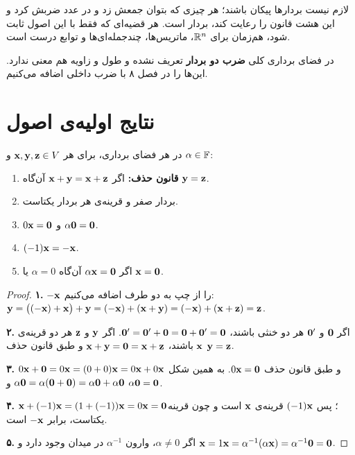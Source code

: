 \begin{intuition}
لازم نیست بردارها پیکان باشند؛ هر چیزی که بتوان جمعش زد و در عدد ضربش کرد و این هشت قانون را رعایت کند، بردار است. هر قضیه‌ای که فقط با این اصول ثابت شود، هم‌زمان برای $\mathbb{R}^n$، ماتریس‌ها، چندجمله‌ای‌ها و توابع درست است.
\end{intuition}

\begin{warning}
در فضای برداری کلی \textbf{ضرب دو بردار} تعریف نشده و طول و زاویه هم معنی ندارد. این‌ها را در فصل ۸ با ضرب داخلی  اضافه می‌کنیم.
\end{warning}

\section{نتایج اولیه‌ی اصول}

\begin{theorem}\label{thm:vs-basic}
در هر فضای برداری، برای هر $\mathbf{x},\mathbf{y},\mathbf{z}\in V$ و $\alpha\in\mathbb{F}$:
\begin{enumerate}
  \item \textbf{قانون حذف:} اگر $\mathbf{x}+\mathbf{y}=\mathbf{x}+\mathbf{z}$ آن‌گاه $\mathbf{y}=\mathbf{z}$.
  \item بردار صفر و قرینه‌ی هر بردار یکتاست.
  \item $0\mathbf{x}=\mathbf{0}$ و $\alpha\mathbf{0}=\mathbf{0}$.
  \item $(-1)\mathbf{x}=-\mathbf{x}$.
  \item اگر $\alpha\mathbf{x}=\mathbf{0}$ آن‌گاه $\alpha=0$ یا $\mathbf{x}=\mathbf{0}$.
\end{enumerate}
\end{theorem}
\begin{proof}
\textbf{۱.} $-\mathbf{x}$ را از چپ به دو طرف اضافه می‌کنیم:
$\mathbf{y}=\big((-\mathbf{x})+\mathbf{x}\big)+\mathbf{y}=(-\mathbf{x})+(\mathbf{x}+\mathbf{y})=(-\mathbf{x})+(\mathbf{x}+\mathbf{z})=\mathbf{z}$.

\textbf{۲.} اگر $\mathbf{0}$ و $\mathbf{0}'$ هر دو خنثی باشند، $\mathbf{0}'=\mathbf{0}'+\mathbf{0}=\mathbf{0}+\mathbf{0}'=\mathbf{0}$. اگر $\mathbf{y}$ و $\mathbf{z}$ هر دو قرینه‌ی $\mathbf{x}$ باشند، $\mathbf{x}+\mathbf{y}=\mathbf{0}=\mathbf{x}+\mathbf{z}$ و طبق قانون حذف $\mathbf{y}=\mathbf{z}$.

\textbf{۳.} $0\mathbf{x}+\mathbf{0}=0\mathbf{x}=(0+0)\mathbf{x}=0\mathbf{x}+0\mathbf{x}$ و طبق قانون حذف $0\mathbf{x}=\mathbf{0}$. به همین شکل $\alpha\mathbf{0}=\alpha(\mathbf{0}+\mathbf{0})=\alpha\mathbf{0}+\alpha\mathbf{0}$ و $\alpha\mathbf{0}=\mathbf{0}$.

\textbf{۴.} $\mathbf{x}+(-1)\mathbf{x}=(1+(-1))\mathbf{x}=0\mathbf{x}=\mathbf{0}$؛ پس $(-1)\mathbf{x}$ قرینه‌ی $\mathbf{x}$ است و چون قرینه یکتاست، برابر $-\mathbf{x}$ است.

\textbf{۵.} اگر $\alpha\neq0$، وارون  $\alpha^{-1}$ در میدان وجود دارد و
$\mathbf{x}=1\mathbf{x}=\alpha^{-1}(\alpha\mathbf{x})=\alpha^{-1}\mathbf{0}=\mathbf{0}$.
\end{proof}

